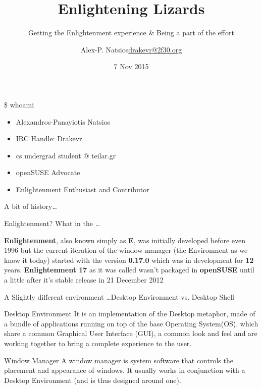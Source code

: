 \documentclass{beamer}
\title{Enlightening Lizards}
\subtitle{Getting the Enlightenment experience \& Being a part of the effort}
\author{\texorpdfstring{Alex-P. Natsios\newline\url{drakevr@2f30.org}}{Author}}
\institute{Fosscomm 2015 - Athens}
\date{7 Nov 2015}
\begin{document}
    \begin{frame}
       \titlepage
    \end{frame}

    \begin{frame}{\$ whoami}
        \begin{itemize}
            \item Alexandros-Panayiotis Natsios
            \item IRC Handle: Drakevr
            \item cs undergrad student @ teilar.gr
            \item openSUSE Advocate
            \item Enlightenment Enthusiast and Contributor
        \end{itemize}
    \end{frame}

    \begin{frame}
        \center\huge A bit of history\ldots
    \end{frame}

    \begin{frame}{Enlightenment? What in the \ldots}

        {\bf Enlightenment}, also known simply as {\bf E}, was initially
        developed before even 1996 but the current iteration of the window
        manager (the Environment as we know it today) started with the version
        {\bf 0.17.0} which was in development for {\bf 12} years.
        {\bf Enlightenment 17} as it was called wasn't packaged in {\bf openSUSE}
        until a little after it's stable release in 21 December 2012

    \end{frame}

    \begin{frame}{A Slightly different environment \ldots}{Desktop Environment vs. Desktop Shell}
        \begin{block}{Desktop Environment}
            It is an implementation of the Desktop metaphor, made of a bundle of
            applications running on top of the base Operating System(OS). which
            share a common Graphical User Interface (GUI), a common look and
            feel and are working together to bring a complete experience to the
            user.
        \end{block}

        \begin{block}{Window Manager}
            A window manager is system software that controls the placement and
            appearance of windows.
            It usually works in conjunction with a Desktop Environment (and is
            thus designed around one).
        \end{block}
    \end{frame}
\end{document}
